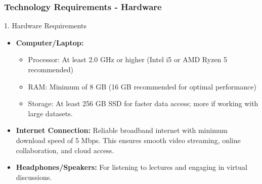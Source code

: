 \documentclass[aspectratio=169]{beamer}
\begin{document}
\begin{frame}[fragile]
    \frametitle{Technology Requirements - Hardware}
    \begin{block}{1. Hardware Requirements}
        \begin{itemize}
            \item \textbf{Computer/Laptop:} 
                \begin{itemize}
                    \item Processor: At least 2.0 GHz or higher (Intel i5 or AMD Ryzen 5 recommended)
                    \item RAM: Minimum of 8 GB (16 GB recommended for optimal performance)
                    \item Storage: At least 256 GB SSD for faster data access; more if working with large datasets.
                \end{itemize}
            
            \item \textbf{Internet Connection:} Reliable broadband internet with minimum download speed of 5 Mbps. This ensures smooth video streaming, online collaboration, and cloud access.
            
            \item \textbf{Headphones/Speakers:} For listening to lectures and engaging in virtual discussions.
        \end{itemize}
    \end{block}
\end{frame}
\end{document}
